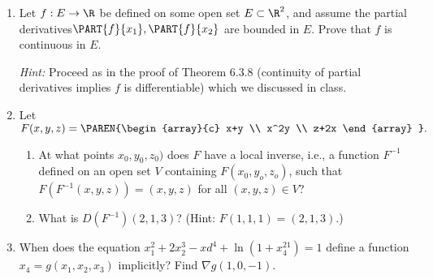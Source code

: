 \documentclass[10pt,a4paper]{report}
\begin{document}
\begin{enumerate}[label=\Roman*.]
\begin{enumerate}[label=(\alph*)]
\end{enumerate}
	\item Let $f:E\to \R$ be defined on some open set $E \subset \R^2$, and assume the partial derivatives$\PART{f}{x_1}, \PART{f}{x_2}$ are bounded in $E$.  Prove that $f$ is continuous in $E$.
	
	\textit{Hint: } Proceed as in the proof of Theorem 6.3.8 (continuity of partial derivatives implies $f$ is differentiable) which we discussed in class.
	
	\item Let $F(x,y,z) = \PAREN{\begin{array}{c}
		x+y \\
		x^2y \\
		z+2x	
	\end{array} }.$
	
	\begin{enumerate}[label=(\alph*)]
		\item At what points $x_0, y_0, z_0)$ does $F$ have a local inverse, i.e., a function $F^{-1}$ defined on an open set $V$ containing $F(x_0, y_o, z_o)$, such that $F(F^{-1}(x,y,z))=(x,y,z)$ for all $(x,y,z) \in V$?
		
		\item What is $D(F^{-1})(2,1,3)$?  (Hint: $F(1,1,1)=(2,1,3)$.)
	\end{enumerate}
	
	\item When does the equation $x_1^2+2x_2^3-xd^4+\ln(1+x_4^21)=1$ define a function $x_4=g(x_1,x_2,x_3)$ implicitly? Find $\nabla g(1,0,-1)$.
\end{enumerate}
\end{document}
